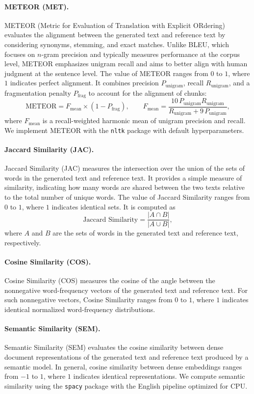 \paragraph{METEOR (MET).}
METEOR (Metric for Evaluation of Translation with Explicit ORdering) evaluates the alignment between the generated text and reference text by considering synonyms, stemming, and exact matches. Unlike BLEU, which focuses on \(n\)-gram precision and typically measures performance at the corpus level, METEOR emphasizes unigram recall and aims to better align with human judgment at the sentence level. The value of METEOR ranges from \(0\) to \(1\), where \(1\) indicates perfect alignment. It combines precision \(P_{\mathrm{unigram}}\), recall \(R_{\mathrm{unigram}}\), and a fragmentation penalty \(P_{\mathrm{frag}}\) to account for the alignment of chunks:
\[
\text{METEOR} = F_{\mathrm{mean}} \times (1 - P_{\mathrm{frag}}),
\qquad
F_{\mathrm{mean}} = \frac{10\, P_{\mathrm{unigram}} R_{\mathrm{unigram}}}{R_{\mathrm{unigram}} + 9\, P_{\mathrm{unigram}}},
\]
where \(F_{\mathrm{mean}}\) is a recall-weighted harmonic mean of unigram precision and recall. We implement METEOR with the \texttt{nltk} package with default hyperparameters.

\paragraph{Jaccard Similarity (JAC).}
Jaccard Similarity (JAC) measures the intersection over the union of the sets of words in the generated text and reference text. It provides a simple measure of similarity, indicating how many words are shared between the two texts relative to the total number of unique words. The value of Jaccard Similarity ranges from \(0\) to \(1\), where \(1\) indicates identical sets. It is computed as
\[
\text{Jaccard Similarity} = \frac{|A \cap B|}{|A \cup B|},
\]
where \(A\) and \(B\) are the sets of words in the generated text and reference text, respectively.

\paragraph{Cosine Similarity (COS).}
Cosine Similarity (COS) measures the cosine of the angle between the nonnegative word-frequency vectors of the generated text and reference text. For such nonnegative vectors, Cosine Similarity ranges from \(0\) to \(1\), where \(1\) indicates identical normalized word-frequency distributions.

\paragraph{Semantic Similarity (SEM).}
Semantic Similarity (SEM) evaluates the cosine similarity between dense document representations of the generated text and reference text produced by a semantic model. In general, cosine similarity between dense embeddings ranges from \(-1\) to \(1\), where \(1\) indicates identical representations. We compute semantic similarity using the \texttt{spacy} package with the English pipeline optimized for CPU.

